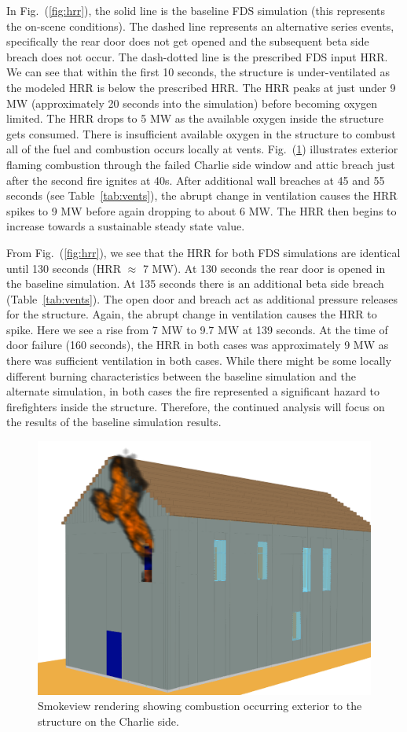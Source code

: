 \documentclass[11pt,oneside]{book}
\begin{document}
In Fig.~(\ref{fig:hrr}), the solid line is the baseline FDS simulation (this represents the on-scene conditions). The dashed line represents an alternative series events, specifically the rear door does not get opened and the subsequent beta side breach does not occur. The dash-dotted line is the prescribed FDS input HRR. We can see that within the first 10 seconds, the structure is under-ventilated as the modeled HRR is below the prescribed HRR. The HRR peaks at just under 9 MW (approximately 20 seconds into the simulation) before becoming oxygen limited. The HRR drops to 5 MW as the available oxygen inside the structure gets consumed. There is insufficient available oxygen in the structure to combust all of the fuel and combustion occurs locally at vents. Fig.~(\ref{fig:smv_ext_fire}) illustrates exterior flaming combustion through the failed Charlie side window and attic breach just after the second fire ignites at 40s. After additional wall breaches at 45 and 55 seconds (see Table~\ref{tab:vents}), the abrupt change in ventilation causes the HRR spikes to 9 MW before again dropping to about 6 MW. The HRR then begins to increase towards a sustainable steady state value.

From Fig.~(\ref{fig:hrr}), we see that the HRR for both FDS simulations are identical until 130 seconds (HRR $\approx$ 7 MW). At 130 seconds the rear door is opened in the baseline simulation. At 135 seconds there is an additional beta side breach (Table~\ref{tab:vents}). The open door and breach act as additional pressure releases for the structure. Again, the abrupt change in ventilation causes the HRR to spike. Here we see a rise from 7 MW to 9.7 MW at 139 seconds. At the time of door failure (160 seconds), the HRR in both cases was approximately 9 MW as there was sufficient ventilation in both cases. While there might be some locally different burning characteristics between the baseline simulation and the alternate simulation, in both cases the fire represented a significant hazard to firefighters inside the structure. Therefore, the continued analysis will focus on the results of the baseline simulation results.

\begin{figure}[h!]
\centering
\includegraphics[width=.675\textwidth]{../Figures/smv_exterior_fire}
\caption{Smokeview rendering showing combustion occurring exterior to the structure on the Charlie side.}
\label{fig:smv_ext_fire}
\end{figure}
\end{document}

